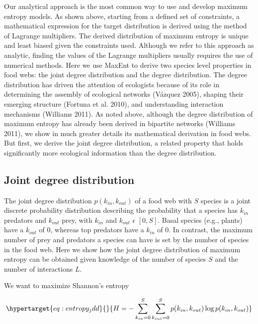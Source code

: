 \documentclass[11pt]{article}
\begin{document}
Our analytical approach is the most common way to use and develop
maximum entropy models. As shown above, starting from a defined set of
constraints, a mathematical expression for the target distribution is
derived using the method of Lagrange multipliers. The derived
distribution of maximum entropy is unique and least biased given the
constraints used. Although we refer to this approach as analytic,
finding the values of the Lagrange multipliers usually requires the use
of numerical methods. Here we use MaxEnt to derive two species level
properties in food webs: the joint degree distribution and the degree
distribution. The degree distribution has driven the attention of
ecologists because of its role in determining the assembly of ecological
networks (Vázquez 2005), shaping their emerging structure (Fortuna et
al. 2010), and understanding interaction mechanisms (Williams 2011). As
noted above, although the degree distribution of maximum entropy has
already been derived in bipartite networks (Williams 2011), we show in
much greater details its mathematical derivation in food webs. But
first, we derive the joint degree distribution, a related property that
holds significantly more ecological information than the degree
distribution.

\hypertarget{joint-degree-distribution}{%
\subsection{Joint degree distribution}\label{joint-degree-distribution}}

The joint degree distribution \(p(k_{in},k_{out})\) of a food web with
\(S\) species is a joint discrete probability distribution describing
the probability that a species has \(k_{in}\) predators and \(k_{out}\)
prey, with \(k_{in}\) and \(k_{out}\) \(\epsilon\) \([0, S]\). Basal
species (e.g., plants) have a \(k_{out}\) of \(0\), whereas top
predators have a \(k_{in}\) of \(0\). In contrast, the maximum number of
prey and predators a species can have is set by the number of species in
the food web. Here we show how the joint degree distribution of maximum
entropy can be obtained given knowledge of the number of species \(S\)
and the number of interactions \(L\).

We want to maximize Shannon's entropy

\begin{equation}\protect\hypertarget{eq:entropy_jdd}{}{H = -\sum_{k_{in}=0}^S\sum_{k_{out}=0}^S p(k_{in},k_{out}) \log p(k_{in},k_{out})}\label{eq:entropy_jdd}\end{equation}
\end{document}
